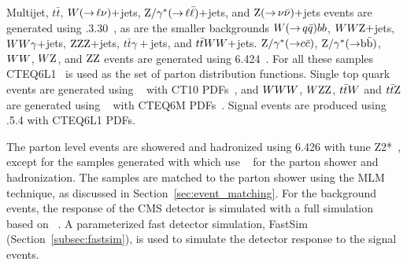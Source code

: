 Multijet, $t\bar{t}$, $W({\rightarrow}\,\ell\nu)+$jets, $\mathrm{Z}/\gamma^*({\rightarrow}\,
\ell\bar{\ell})+$jets, and $\mathrm{Z}({\rightarrow}\, \nu \bar{\nu})+$jets events are generated using
.3.30~\cite{Alwall:2011uj}, as are the smaller backgrounds $W({\rightarrow}\, q
\bar{q})bb$, 
$WW\mathrm{Z}+$jets, $WW\gamma+$jets, $\mathrm{Z}\mathrm{Z}\mathrm{Z}+$jets, $t\bar{t}\gamma+$jets, and
$t\bar{t}WW+$jets.
$\mathrm{Z}/\gamma^*({\rightarrow} c\bar{c})$, $\mathrm{Z}/\gamma^*({\rightarrow} \mathrm{b}\bar{\mathrm{b}})$,
$WW$, $W\mathrm{Z}$, and $\mathrm{Z}\mathrm{Z}$ events are generated using 
{\PYTHIA}6.424~\cite{Sjostrand:2006za}.
For all these samples CTEQ6L1~\cite{Pumplin:2002vw} is used as the set of parton distribution
functions. 
Single top quark events are generated using ~\cite{powheg,powheg2} with CT10
PDFs~\cite{Lai:2010vv}, and $WWW$, $W\mathrm{Z}\mathrm{Z}$, $t\bar{t}W$ and $t\bar{t}\mathrm{Z}$ are generated using
\AMCATNLO~\cite{Frixione:2002ik} with CTEQ6M PDFs~\cite{Pumplin:2002vw}. 
Signal events are produced using .5.4 with CTEQ6L1 PDFs.  

The parton level events are showered and hadronized using {\PYTHIA}6.426 with tune
Z2*~\cite{Chatrchyan:2013gfi}, except for the samples generated with \AMCATNLO which use 
\HERWIG~\cite{Corcella:2000bw,Corcella:2002jc} for the parton shower and hadronization.  
The \MADGRAPH samples are matched to the parton shower using the MLM technique, as discussed
in Section~\ref{sec:event_matching}.
For the background events, the response of the CMS detector is
simulated with a full simulation based on \GEANTfour~\cite{G4}.  
A parameterized fast detector simulation, \ie FastSim (Section~\ref{subsec:fastsim}), is used to
simulate the detector response to the signal events. 


